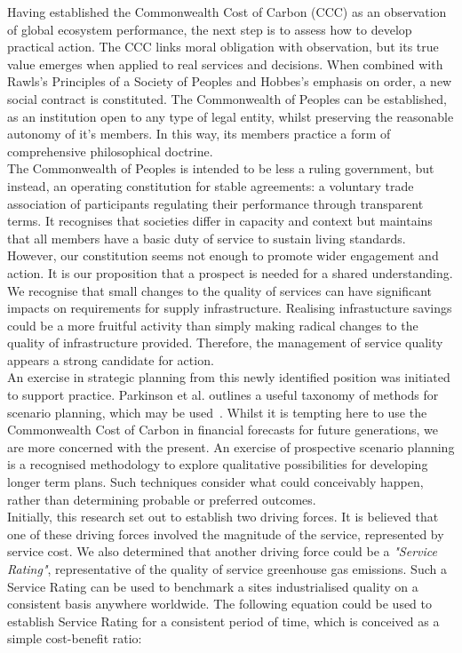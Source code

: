 \documentclass[12pt, oneside]{article}   	%
\begin{document}
Having established the Commonwealth Cost of Carbon (CCC) as an observation of global ecosystem performance, the next step is to assess how to develop practical action.
The CCC links moral obligation with observation, but its true value emerges when applied to real services and decisions.
When combined with Rawls’s Principles of a Society of Peoples and Hobbes’s emphasis on order, a new social contract is constituted.
The Commonwealth of Peoples can be established, as an institution open to any type of legal entity, whilst preserving the reasonable autonomy of it's members.
In this way, its members practice a form of comprehensive philosophical doctrine.\\

The Commonwealth of Peoples is intended to be less a ruling government, but instead, an operating constitution for stable agreements: a voluntary trade association of participants regulating their performance through transparent terms.
It recognises that societies differ in capacity and context but maintains that all members have a basic duty of service to sustain living standards.\\

However, our constitution seems not enough to promote wider engagement and action.
It is our proposition that a prospect is needed for a shared understanding.
We recognise that small changes to the quality of services can have significant impacts on requirements for supply infrastructure.
Realising infrastucture savings could be a more fruitful activity than simply making radical changes to the quality of infrastructure provided.
Therefore, the management of service quality appears a strong candidate for action.\\

An exercise in strategic planning from this newly identified position was initiated to support practice.
Parkinson et al. outlines a useful taxonomy of methods for scenario planning, which may be used~\cite{atp1}.
Whilst it is tempting here to use the Commonwealth Cost of Carbon in financial forecasts for future generations, we are more concerned with the present.
An exercise of prospective scenario planning is a recognised methodology to explore qualitative possibilities for developing longer term plans.
Such techniques consider what could conceivably happen, rather than determining probable or preferred outcomes.\\

Initially, this research set out to establish two driving forces.
It is believed that one of these driving forces involved the magnitude of the service, represented by service cost.
We also determined that another driving force could be a \emph{"Service Rating"}, representative of the quality of service greenhouse gas emissions.
Such a Service Rating can be used to benchmark a sites industrialised quality on a consistent basis anywhere worldwide.
The following equation could be used to establish Service Rating for a consistent period of time, which is conceived as a simple cost-benefit ratio:\\
\end{document}
